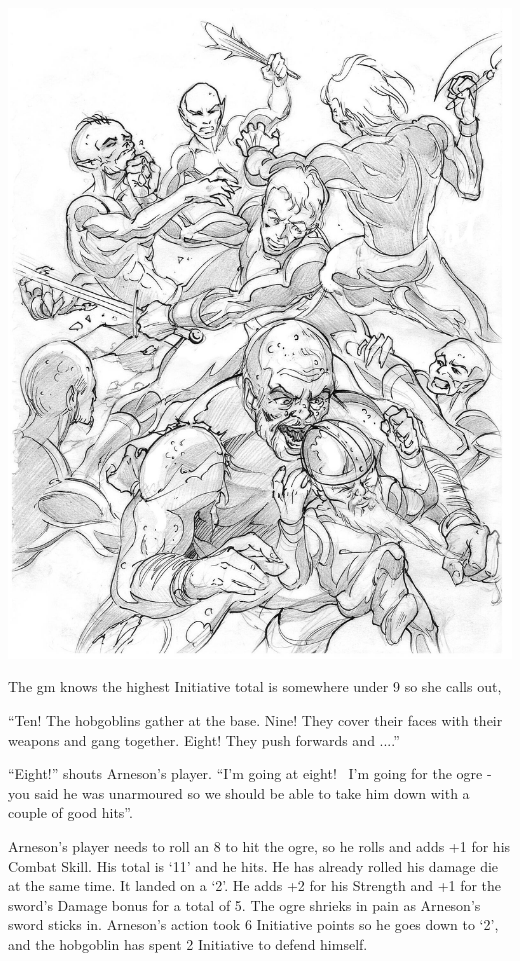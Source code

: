 \begin{multicols}{2}
{\begin{exampletext}
	\noindent\includegraphics[width=\linewidth]{images/Boris_Pecikozic/nura_brawl.jpg}
	\label{boris:brawl}

	The \gls{gm} knows the highest Initiative total is somewhere under 9 so she calls out,

	``Ten! The hobgoblins gather at the base. Nine! They cover their faces with their weapons and gang together. Eight! They push forwards and ....''

	``Eight!'' shouts Arneson's player. ``I'm going at eight! \ I'm going for the ogre - you said he was unarmoured so we should be able to take him down with a couple of good hits''.


	Arneson's player needs to roll an 8 to hit the ogre, so he rolls and adds +1 for his Combat Skill. His total is `11' and he hits. He has already rolled his damage die at the same time. It landed on a `2'. He adds +2 for his Strength and +1 for the sword's Damage bonus for a total of 5. The ogre shrieks in pain as Arneson's sword sticks in. Arneson's action took 6 Initiative points so he goes down to `2', and the hobgoblin has spent 2 Initiative to defend himself.


\end{exampletext}}
\end{multicols}
